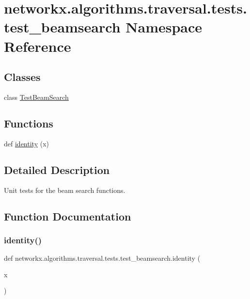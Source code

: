 \hypertarget{namespacenetworkx_1_1algorithms_1_1traversal_1_1tests_1_1test__beamsearch}{}\section{networkx.\+algorithms.\+traversal.\+tests.\+test\+\_\+beamsearch Namespace Reference}
\label{namespacenetworkx_1_1algorithms_1_1traversal_1_1tests_1_1test__beamsearch}
\subsection*{Classes}
\begin{DoxyCompactItemize}
\item 
class \hyperlink{classnetworkx_1_1algorithms_1_1traversal_1_1tests_1_1test__beamsearch_1_1TestBeamSearch}{Test\+Beam\+Search}
\end{DoxyCompactItemize}
\subsection*{Functions}
\begin{DoxyCompactItemize}
\item 
def \hyperlink{namespacenetworkx_1_1algorithms_1_1traversal_1_1tests_1_1test__beamsearch_ae82747c1fe0b6fef9b5ca98120381ac4}{identity} (x)
\end{DoxyCompactItemize}


\subsection{Detailed Description}
\begin{DoxyVerb}Unit tests for the beam search functions.\end{DoxyVerb}
 

\subsection{Function Documentation}
\mbox{\label{namespacenetworkx_1_1algorithms_1_1traversal_1_1tests_1_1test__beamsearch_ae82747c1fe0b6fef9b5ca98120381ac4}} 
\subsubsection{\texorpdfstring{identity()}{identity()}}
{\footnotesize\ttfamily def networkx.\+algorithms.\+traversal.\+tests.\+test\+\_\+beamsearch.\+identity (\begin{DoxyParamCaption}\item[{}]{x }\end{DoxyParamCaption})}

